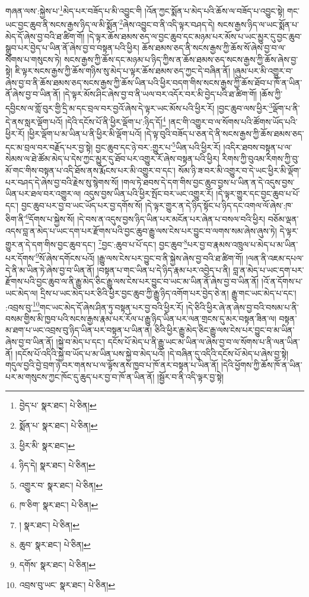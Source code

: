 གཞན་ལས་:སྐྱེས་པ་\footnote{བྱེད་པ་  སྣར་ཐང་།  པེ་ཅིན། }མེད་པར་བཟོད་པ་མི་འབྱུང་གི །འོན་ཀྱང་སྨོན་པ་མེད་པའི་ཆོས་ལ་བཟོད་པ་འབྱུང་སྟེ། གང་ཡང་བྱང་ཆུབ་ནི་སངས་རྒྱས་ཉིད་ལ་མི་སྨོན་\footnote{སྨོན་པ་  སྣར་ཐང་།  པེ་ཅིན། }ཞེས་འབྱུང་བ་ནི་འདི་ལྟར་བཤད་དེ། སངས་རྒྱས་ཉིད་ལ་ཡང་སྨོན་པ་མེད་དོ་ཞེས་བྱ་བའི་ཐ་ཚིག་གོ། །དེ་ལྟར་ཆོས་ཐམས་ཅད་ལ་བྱང་ཆུབ་དང་མཉམ་པར་མོས་པ་ཡང་མྱུར་དུ་བྱང་ཆུབ་སྒྲུབ་པར་བྱེད་པ་ཡིན་ནོ་ཞེས་བྱ་བ་བསྟན་པའི་ཕྱིར། ཆོས་ཐམས་ཅད་ནི་སངས་རྒྱས་ཀྱི་ཆོས་སོ་ཞེས་བྱ་བ་ལ་སོགས་པ་གསུངས་ཏེ། སངས་རྒྱས་ཀྱི་ཆོས་དང་མཉམ་པ་ཉིད་ཀྱིས་ན་ཆོས་ཐམས་ཅད་སངས་རྒྱས་ཀྱི་ཆོས་ཞེས་བྱ་སྟེ། ཇི་ལྟར་སངས་རྒྱས་ཀྱི་ཆོས་གཉིས་སུ་མེད་པ་ལྟར་ཆོས་ཐམས་ཅད་ཀྱང་དེ་བཞིན་ནོ། །ཞུམ་པར་མི་འགྱུར་བ་ཞེས་བྱ་བ་ནི་ཆོས་ཐམས་ཅད་སངས་རྒྱས་ཀྱི་ཆོས་ཡིན་པའི་ཕྱིར་བདག་གིས་སངས་རྒྱས་ཀྱི་ཆོས་ཐོབ་པ་ཁོ་ན་ཡིན་ནོ་ཞེས་བྱ་བ་ཡིན་ནོ། །དེ་ལྟར་མོས་ཤིང་ཞེས་བྱ་བ་ནི་ཡལ་བར་འདོར་བར་མི་བྱེད་པའི་ཐ་ཚིག་གོ། །ཆོས་ཀྱི་དབྱིངས་ལ་གློ་བུར་གྱི་དྲི་མ་དང་བྲལ་བར་བྱའོ་ཞེས་དེ་ལྟར་ཡང་མོས་པའི་ཕྱིར་རོ། །བྱང་ཆུབ་ལས་ཕྱིར་\footnote{ཕྱིར་མི་  སྣར་ཐང་། }ལྡོག་པ་ནི་དེ་ནས་སླར་ལྡོག་པའོ། །དེའི་དངོས་པོ་ནི་ཕྱིར་ལྡོག་པ་:ཉིད་དོ།\footnote{ཉིད་དེ།  སྣར་ཐང་།  པེ་ཅིན། } །ནང་གི་འགྱུར་བ་ལ་སོགས་པའི་ཚོགས་ཡོད་པའི་ཕྱིར་རོ། །ཕྱིར་ལྡོག་པ་མ་ཡིན་པ་ནི་ཕྱིར་མི་ལྡོག་པའོ། །དེ་ལྟ་བུའི་བཟོད་པ་ཅན་དེ་ནི་སངས་རྒྱས་ཀྱི་ཆོས་ཐམས་ཅད་དང་མ་བྲལ་བར་བརྗོད་པར་བྱ་སྟེ། བྱང་ཆུབ་དང་ཉེ་བར་:གྱུར་པ་\footnote{འགྱུར་བ་  སྣར་ཐང་།  པེ་ཅིན། }ཡིན་པའི་ཕྱིར་རོ། །འདིར་ཐབས་བསྟན་པ་ལ་སེམས་ལ་ཐེ་ཚོམ་མེད་པ་དེས་ཀྱང་མྱུར་དུ་ཐོབ་པར་འགྱུར་རོ་ཞེས་བསྟན་པའི་ཕྱིར། རིགས་ཀྱི་བུའམ་རིགས་ཀྱི་བུ་མོ་གང་གིས་བསྟན་པ་འདི་ཐོས་ནས་རྨོངས་པར་མི་འགྱུར་བ་དང་། སོམ་ཉི་ཟ་བར་མི་འགྱུར་བ་དེ་ཡང་ཕྱིར་མི་ལྡོག་པར་བཤད་དེ་ཞེས་བྱ་བའི་རྗེས་སུ་སྙེགས་སོ། །གལ་ཏེ་ཐབས་དེ་དག་གིས་བྱང་ཆུབ་བྱས་པ་ཡིན་ན་དེ་འདུས་བྱས་ཡིན་པར་ཐལ་བར་འགྱུར་ལ། འདུས་བྱས་ཡིན་པའི་ཕྱིར་སྤོང་བར་ཡང་འགྱུར་རོ། །དེ་ལྟར་གྱུར་དང་བྱང་ཆུབ་པ་པོ་དང་། བྱང་ཆུབ་པར་བྱ་བ་ཡང་ཡོད་པར་བྱ་དགོས་སོ། །དེ་ལྟར་གྱུར་ན་དེ་ཉིད་སྟོང་པ་ཉིད་དང་འགལ་ལོ་ཞེས་:ཁ་ཅིག་ནི་\footnote{ཁ་ཅིག་  སྣར་ཐང་།  པེ་ཅིན། }དོགས་པ་སྐྱེས་སོ། །དེ་བས་ན་འདུས་བྱས་ཉིད་ཡིན་པར་མངོན་པར་ཞེན་པ་བསལ་བའི་ཕྱིར། བཅོམ་ལྡན་འདས་བླ་ན་མེད་པ་ཡང་དག་པར་རྫོགས་པའི་བྱང་ཆུབ་རྒྱུ་ལས་ངེས་པར་བྱུང་བ་ལགས་སམ་ཞེས་ཞུས་ཏེ། དེ་ལྟར་གྱུར་ན་དེ་དག་གིས་བྱང་ཆུབ་དང་། \footnote{།    སྣར་ཐང་།  པེ་ཅིན། }བྱང་:ཆུབ་པ་པོ་དང་། བྱང་ཆུབ་\footnote{ཆུབ་  སྣར་ཐང་།  པེ་ཅིན། }པར་བྱ་བ་རྣམས་འཁྲུལ་པ་མེད་པ་མ་ཡིན་པར་དོགས་\footnote{དགོས་  སྣར་ཐང་།  པེ་ཅིན། }སོ་ཞེས་དགོངས་པའོ། །རྒྱུ་ལས་ངེས་པར་བྱུང་བ་ནི་སྐྱེས་ཞེས་བྱ་བའི་ཐ་ཚིག་གོ། །ལན་ནི་འཇམ་དཔལ་དེ་ནི་མ་ཡིན་ཏེ་ཞེས་བྱ་བ་ཡིན་ནོ། །བསྟན་པ་གང་ཡིན་པ་དེ་ཉིད་རྣམ་པར་འབྱེད་པ་ནི། བླ་ན་མེད་པ་ཡང་དག་པར་རྫོགས་པའི་བྱང་ཆུབ་ལ་ནི་རྒྱུ་མེད་ཅིང་རྒྱུ་ལས་ངེས་པར་བྱུང་བ་ཡང་མ་ཡིན་ནོ་ཞེས་བྱ་བ་ཡིན་ནོ། །འོ་ན་དོགས་པ་ཡང་མེད་ལ། དྲིས་པ་ཡང་མེད་པར་ཅིའི་ཕྱིར་བྱང་ཆུབ་ཀྱི་རྒྱུ་ཉིད་འགོག་པར་བྱེད་ཅེ་ན། རྒྱུ་གང་ཡང་མེད་པ་དང་། :འབྲས་བུ་\footnote{འབྲས་བུ་ཡང་  སྣར་ཐང་།  པེ་ཅིན། }གང་ཡང་མེད་དོ་ཞེས་ཤིན་ཏུ་བསྟན་པར་བྱ་བའི་ཕྱིར་རོ། །དེ་ཅིའི་ཕྱིར་ཞེ་ན་ཞེས་བྱ་བའི་བསམ་པ་ནི་བསམ་གྱིས་མི་ཁྱབ་པའི་སངས་རྒྱས་རྣམ་པར་རོལ་པ་རྒྱུ་ཉིད་ཡིན་པར་ལན་གྲངས་དུ་མར་བསྟན་ཟིན་ལ། བསྟན་མ་ཐག་པ་ཡང་འབྲས་བུ་ཉིད་ཡིན་པར་བསྟན་པ་ཡིན་ན། ཅིའི་ཕྱིར་རྒྱུ་མེད་ཅིང་རྒྱུ་ལས་ངེས་པར་བྱུང་བ་མ་ཡིན་ཞེས་བྱ་བ་ཡིན་ནོ། །སྐྱེ་བ་མེད་པ་དང་། དངོས་པོ་མེད་པ་ནི་རྒྱུ་ཡང་མ་ཡིན་ལ་ཞེས་བྱ་བ་ལ་སོགས་པ་ནི་ལན་ཡིན་ནོ། །དངོས་པོ་འདིའི་སྐྱེ་བ་ཡོད་པ་མ་ཡིན་པས་སྐྱེ་བ་མེད་པའོ། །དེ་བཞིན་དུ་འདིའི་དངོས་པོ་མེད་པ་ཞེས་བྱ་སྟེ། གདུལ་བྱའི་བྱེ་བྲག་ཉེ་བར་གནས་པ་ལ་ལྟོས་ནས་ཁྱབ་པ་ཁོ་ནར་བསྟན་པ་ཡིན་ནོ། །དེའི་ཕྱོགས་ཀྱི་ཆོས་ཁོ་ན་ཡིན་པར་མ་གསུངས་ཀྱང་ཁོང་དུ་ཆུད་པར་བྱ་བ་ཁོ་ན་ཡིན་ནོ། །སྦྱོར་བ་ནི་འདི་ལྟར་བྱ་སྟེ། 